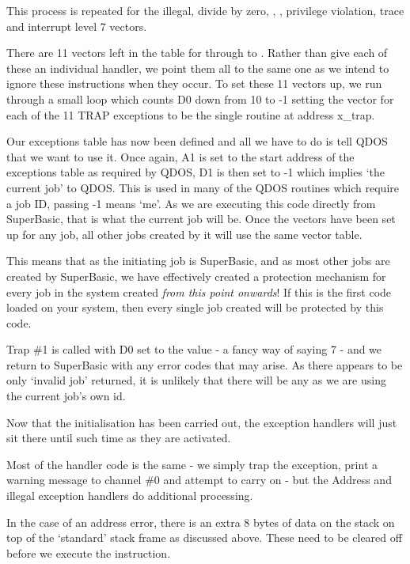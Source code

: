 This process is repeated for the illegal, divide by zero, ,
    , privilege violation, trace and interrupt level 7 vectors.

There are 11 vectors left in the table for  through to . Rather than give each of these an individual handler, we point them all to
    the same one as we intend to ignore these instructions when they occur. To
    set these 11 vectors up, we run through a small loop which counts D0 down
    from 10 to -{}1 setting the vector for each of the 11 TRAP exceptions to be
    the single routine at address x\_trap.

Our exceptions table has now been defined and all we have to do is
    tell QDOS that we want to use it. Once again, A1 is set to the start
    address of the exceptions table as required by QDOS, D1 is then set to -{}1
    which implies `the current job' to QDOS. This is used in many of the QDOS
    routines which require a job ID, passing -{}1 means `me'. As we are
    executing this code directly from SuperBasic, that is what the current job
    will be. Once the vectors have been set up for any job, all other jobs
    created by it will use the same vector table.

This means that as the initiating job is SuperBasic, and as most
    other jobs are created by SuperBasic, we have effectively
    created a protection mechanism for every job in the system created \emph{from this point onwards}! If this is the first code loaded on your system, then
    every single job created will be protected by this code.

Trap \#1 is called with D0 set to the value  -{} a fancy way of
    saying 7 -{} and we return to SuperBasic with any error codes that may
    arise. As there appears to be only `invalid job' returned, it is unlikely
    that there will be any as we are using the current job's own id.

Now that the initialisation has been carried out, the exception
    handlers will just sit there until such time as they are activated.

Most of the handler code is the same -{} we simply trap the exception,
    print a warning message to channel \#0 and attempt to carry on -{} but the
    Address and illegal exception handlers do additional processing.

In the case of an address error, there is an extra 8 bytes of data
    on the stack on top of the `standard' stack frame as discussed above.
    These need to be cleared off before we execute the  instruction.

